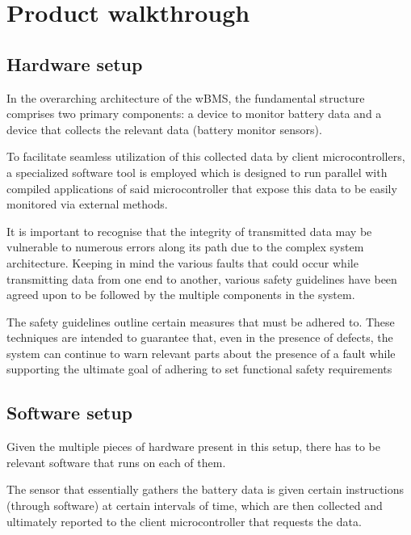\chapter{Product walkthrough} %

\label{ch:walkthrough}


\section{Hardware setup}

In the overarching architecture of the wBMS, the fundamental structure comprises two primary components: a device to monitor battery data and a device that collects the relevant data (battery monitor sensors).

To facilitate seamless utilization of this collected data by client microcontrollers, a specialized software tool is employed which is designed to run parallel with compiled applications of said microcontroller that expose this data to be easily monitored via external methods.

It is important to recognise that the integrity of transmitted data may be vulnerable to numerous errors along its path due to the complex system architecture. Keeping in mind the various faults that could occur while transmitting data from one end to another, various safety guidelines have been agreed upon to be followed by the multiple components in the system.

The safety guidelines outline certain measures that must be adhered to. These techniques are intended to guarantee that, even in the presence of defects, the system can continue to warn relevant parts about the presence of a fault while supporting the ultimate goal of adhering to set functional safety requirements

\section{Software setup}

Given the multiple pieces of hardware present in this setup, there has to be relevant software that runs on each of them.

The sensor that essentially gathers the battery data is given certain instructions (through software) at certain intervals of time, which are then collected and ultimately reported to the client microcontroller that requests the data.

